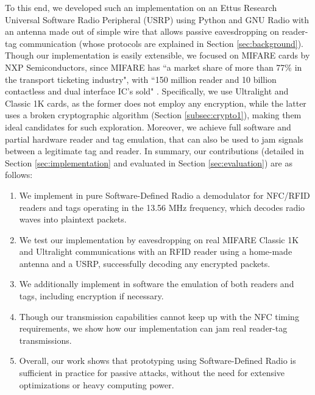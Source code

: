 \documentclass[fleqn,10pt]{SelfArx} %
\begin{document}
To this end, we developed such an implementation on an Ettus Research Universal Software Radio Peripheral (USRP) using Python and GNU Radio with an antenna made out of simple wire that allows passive eavesdropping on reader-tag communication (whose protocols are explained in Section \ref{sec:background}). Though our implementation is easily extensible, we focused on MIFARE cards by NXP Semiconductors, since MIFARE has ``a market share of more than 77\% in the transport ticketing industry", with ``150 million reader and 10 billion contactless and dual interface IC's sold" \cite{mifare}. Specifically, we use Ultralight \cite{ultralight} and Classic 1K \cite{classic1k} cards, as the former does not employ any encryption, while the latter uses a broken cryptographic algorithm (Section \ref{subsec:crypto1}), making them ideal candidates for such exploration. Moreover, we achieve full software and partial hardware reader and tag emulation, that can also be used to jam signals between a legitimate tag and reader. In summary, our contributions (detailed in Section \ref{sec:implementation} and evaluated in Section \ref{sec:evaluation}) are as follows:

\begin{enumerate}[noitemsep]
\item We implement in pure Software-Defined Radio a demodulator for NFC/RFID readers and tags operating in the 13.56 MHz frequency, which decodes radio waves into plaintext packets.
\item We test our implementation by eavesdropping on real MIFARE Classic 1K and Ultralight communications with an RFID reader using a home-made antenna and a USRP, successfully decoding any encrypted packets.
\item We additionally implement in software the emulation of both readers and tags, including encryption if necessary.
\item Though our transmission capabilities cannot keep up with the NFC timing requirements, we show how our implementation can jam real reader-tag transmissions.
\item Overall, our work shows that prototyping using Software-Defined Radio is sufficient in practice for passive attacks, without the need for extensive optimizations or heavy computing power.
\end{enumerate}
\end{document}
